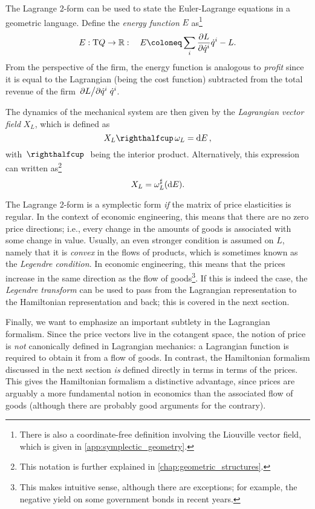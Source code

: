 The Lagrange 2-form can be used to state the Euler-Lagrange equations in a geometric language. Define the \emph{energy function} \(E\) as\footnote{There is also a coordinate-free definition involving the Liouville vector field, which is given in \cref{app:symplectic_geometry}.}
\begin{equation}
    E: \tbundle{Q} \to \real: \quad E \coloneq 
    \sum_i \pdv{L}{\dot{q}^i}\dot{q}^i - L.
\end{equation}
From the perspective of the firm, the energy function is analogous to \emph{profit} since it is equal to the Lagrangian (being the cost function) subtracted from the total revenue of the firm \(\pdv*{L}{\dot{q}^i}\dot{q}^i\).
    
The dynamics of the mechanical system are then given by the \emph{Lagrangian vector field} \(X_L\), which is defined as
\begin{equation}
    \intpr{X_L}{\omega_L} = \dd{E}, 
\end{equation}
with $\intpr{\,}{\,}$ being the interior product. Alternatively, this expression can written as\footnote{This notation is further explained in \cref{chap:geometric_structures}.}
\begin{equation}
    X_L = \omega_L^\sharp(\dd{E}).
\end{equation}

The Lagrange 2-form is a symplectic form \emph{if} the matrix of price elasticities is regular. In the context of economic engineering, this means that there are no zero price directions; i.e., every change in the amounts of goods is associated with some change in value. Usually, an even stronger condition is assumed on \(L\), namely that it is \emph{convex} in the flows of products, which is sometimes known as the \emph{Legendre condition}. In economic engineering, this means that the prices increase in the same direction as the flow of goods\footnote{This makes intuitive sense, although there are exceptions; for example, the negative yield on some government bonds in recent years.}. If this is indeed the case, the \emph{Legendre transform} can be used to pass from the Lagrangian representation to the Hamiltonian representation and back; this is covered in the next section. 

Finally, we want to emphasize an important subtlety in the Lagrangian formalism. Since the price vectors live in the cotangent space, the notion of price is \emph{not} canonically defined in Lagrangian mechanics: a Lagrangian function is required to obtain it from a flow of goods. In contrast, the Hamiltonian formalism discussed in the next section \emph{is} defined directly in terms in terms of the prices. This gives the Hamiltonian formalism a distinctive advantage, since prices are arguably a more fundamental notion in economics than the associated flow of goods (although there are probably good arguments for the contrary).

